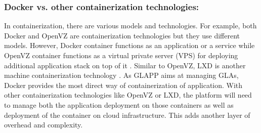 \documentclass{seal_thesis}
\begin{document}


\subsubsection{Docker vs. other containerization technologies:}
In containerization, there are various models and technologies.
For example, both Docker and OpenVZ are containerization technologies but they use different models.
However, Docker container functions as an application or a service while OpenVZ container functions as a virtual private server (VPS) for deploying additional application stack on top of it .
Similar to OpenVZ, LXD is another machine containerization technology .
As GLAPP aims at managing GLAs, Docker provides the most direct way of containerization of application.
With other containerization technologies like OpenVZ or LXD, the platform will need to manage both the application deployment on those containers as well as deployment of the container on cloud infrastructure.
This adds another layer of overhead and complexity.

\end{document}
